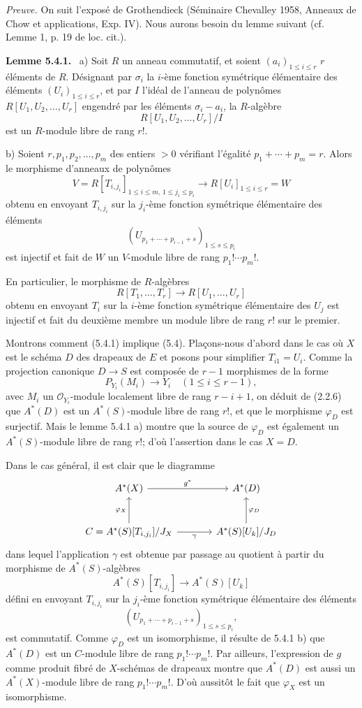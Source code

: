 \documentclass[11pt]{article}
\newenvironment{statement}[1]{\par\medskip\noindent\textbf{#1.}\ }{\par\medskip}
\begin{document}
\emph{Preuve.} On suit l'exposé de Grothendieck (Séminaire Chevalley 1958, Anneaux de Chow et applications, Exp. IV). Nous aurons besoin du lemme suivant (cf. Lemme 1, p. 19 de loc. cit.).

\begin{statement}{Lemme 5.4.1}
a) Soit $R$ un anneau commutatif, et soient $(a_i)_{1\le i\le r}$ $r$ éléments de $R$. Désignant par $\sigma_i$ la $i$-ème fonction symétrique élémentaire des éléments $(U_i)_{1\le i\le r}$, et par $I$ l'idéal de l'anneau de polynômes $R[U_1,U_2,\ldots,U_r]$ engendré par les éléments $\sigma_i-a_i$, la $R$-algèbre
\[
R[U_1,U_2,\ldots,U_r]/I
\]
est un $R$-module libre de rang $r!$.

b) Soient $r,p_1,p_2,\ldots,p_m$ des entiers $>0$ vérifiant l'égalité $p_1+\cdots+p_m=r$. Alors le morphisme d'anneaux de polynômes
\[
V=R[T_{i,j_i}]_{1\le i\le m,\,1\le j_i\le p_i}
\longrightarrow R[U_i]_{1\le i\le r}=W
\]
obtenu en envoyant $T_{i,j_i}$ sur la $j_i$-ème fonction symétrique élémentaire des éléments
\[
(U_{p_1+\cdots+p_{i-1}+s})_{1\le s\le p_i}
\]
est injectif et fait de $W$ un $V$-module libre de rang $p_1!\cdots p_m!$.

En particulier, le morphisme de $R$-algèbres
\[
R[T_1,\ldots,T_r]\to R[U_1,\ldots,U_r]
\]
obtenu en envoyant $T_i$ sur la $i$-ème fonction symétrique élémentaire des $U_j$ est injectif et fait du deuxième membre un module libre de rang $r!$ sur le premier.
\end{statement}

Montrons comment (5.4.1) implique (5.4). Plaçons-nous d'abord dans le cas où $X$ est le schéma $D$ des drapeaux de $E$ et posons pour simplifier $T_{i1}=U_i$. Comme la projection canonique $D\to S$ est composée de $r-1$ morphismes de la forme
\[
P_{Y_i}(M_i)\to Y_i\quad(1\le i\le r-1),
\]
avec $M_i$ un $\mathcal O_{Y_i}$-module localement libre de rang $r-i+1$, on déduit de (2.2.6) que $A^*(D)$ est un $A^*(S)$-module libre de rang $r!$, et que le morphisme $\varphi_D$ est surjectif. Mais le lemme 5.4.1 a) montre que la source de $\varphi_D$ est également un $A^*(S)$-module libre de rang $r!$; d'où l'assertion dans le cas $X=D$.

Dans le cas général, il est clair que le diagramme
\[
\begin{tikzcd}[column sep=large,row sep=large]
A^*(X) \arrow[r,"g^*"] & A^*(D)\\
C=A^*(S)[T_{i,j_i}]/J_X \arrow[u,"\varphi_X"] \arrow[r,"\gamma"'] &
A^*(S)[U_k]/J_D \arrow[u,"\varphi_D"']
\end{tikzcd}
\]
dans lequel l'application $\gamma$ est obtenue par passage au quotient à partir du morphisme de $A^*(S)$-algèbres
\[
A^*(S)[T_{i,j_i}]\to A^*(S)[U_k]
\]
défini en envoyant $T_{i,j_i}$ sur la $j_i$-ème fonction symétrique élémentaire des éléments
\[
(U_{p_1+\cdots+p_{i-1}+s})_{1\le s\le p_i},
\]
est commutatif. Comme $\varphi_D$ est un isomorphisme, il résulte de 5.4.1 b) que $A^*(D)$ est un $C$-module libre de rang $p_1!\cdots p_m!$. Par ailleurs, l'expression de $g$ comme produit fibré de $X$-schémas de drapeaux montre que $A^*(D)$ est aussi un $A^*(X)$-module libre de rang $p_1!\cdots p_m!$. D'où aussitôt le fait que $\varphi_X$ est un isomorphisme.
\end{document}
